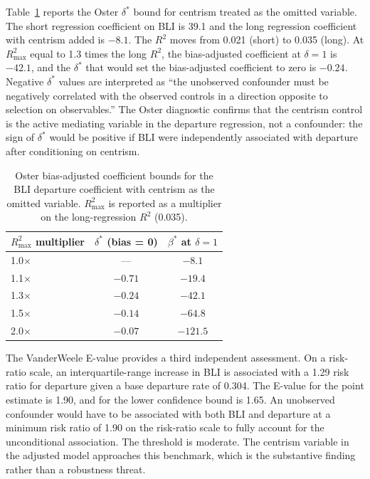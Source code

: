 \documentclass[12pt, a4paper]{article}
\begin{document}
Table~\ref{tab:oster} reports the Oster $\delta^*$ bound for centrism treated as the omitted variable. The short regression coefficient on BLI is 39.1 and the long regression coefficient with centrism added is $-8.1$. The $R^2$ moves from 0.021 (short) to 0.035 (long). At $R^2_{\max}$ equal to 1.3 times the long $R^2$, the bias-adjusted coefficient at $\delta = 1$ is $-42.1$, and the $\delta^*$ that would set the bias-adjusted coefficient to zero is $-0.24$. Negative $\delta^*$ values are interpreted as ``the unobserved confounder must be negatively correlated with the observed controls in a direction opposite to selection on observables.'' The Oster diagnostic confirms that the centrism control is the active mediating variable in the departure regression, not a confounder: the sign of $\delta^*$ would be positive if BLI were independently associated with departure after conditioning on centrism.

\begin{table}[H]
\centering
\caption{Oster bias-adjusted coefficient bounds for the BLI departure coefficient with centrism as the omitted variable. $R^2_{\max}$ is reported as a multiplier on the long-regression $R^2$ (0.035).}
\label{tab:oster}
\small
\begin{tabular}{lcc}
\toprule
$R^2_{\max}$ multiplier & $\delta^*$ (bias = 0) & $\beta^*$ at $\delta = 1$ \\
\midrule
1.0$\times$ & --- & $-8.1$ \\
1.1$\times$ & $-0.71$ & $-19.4$ \\
1.3$\times$ & $-0.24$ & $-42.1$ \\
1.5$\times$ & $-0.14$ & $-64.8$ \\
2.0$\times$ & $-0.07$ & $-121.5$ \\
\bottomrule
\end{tabular}
\end{table}

The VanderWeele E-value provides a third independent assessment. On a risk-ratio scale, an interquartile-range increase in BLI is associated with a 1.29 risk ratio for departure given a base departure rate of 0.304. The E-value for the point estimate is 1.90, and for the lower confidence bound is 1.65. An unobserved confounder would have to be associated with both BLI and departure at a minimum risk ratio of 1.90 on the risk-ratio scale to fully account for the unconditional association. The threshold is moderate. The centrism variable in the adjusted model approaches this benchmark, which is the substantive finding rather than a robustness threat.
\end{document}

